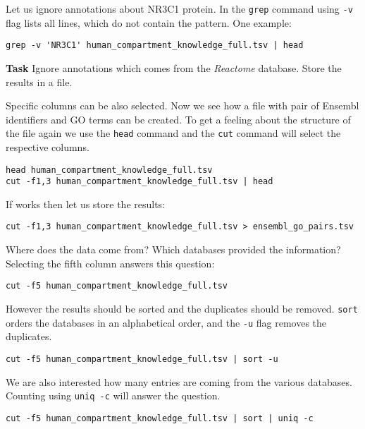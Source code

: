 \documentclass{article}\usepackage[]{graphicx}\usepackage[usenames,dvipsnames]{color}
\begin{document}
Let us ignore annotations about NR3C1 protein. In the \verb+grep+ command using \verb+-v+ flag lists all lines, which do not contain the pattern. One example:

\begin{verbatim}
grep -v 'NR3C1' human_compartment_knowledge_full.tsv | head
\end{verbatim}

\textbf{Task} Ignore annotations which comes from the \emph{Reactome} database. Store the results in a file.

Specific columns can be also selected. Now we see how a file with pair of Ensembl identifiers and GO terms can be created. To get a feeling about the structure of the file again we use the \verb+head+ command and the \verb+cut+ command will select the respective columns.

\begin{verbatim}
head human_compartment_knowledge_full.tsv
cut -f1,3 human_compartment_knowledge_full.tsv | head
\end{verbatim}

If works then let us store the results:

\begin{verbatim}
cut -f1,3 human_compartment_knowledge_full.tsv > ensembl_go_pairs.tsv
\end{verbatim}

Where does the data come from? Which databases provided the information? Selecting the fifth column answers this question:

\begin{verbatim}
cut -f5 human_compartment_knowledge_full.tsv
\end{verbatim}

However the results should be sorted and the duplicates should be removed. \verb+sort+ orders the databases in an alphabetical order, and the \verb+-u+ flag removes the duplicates.

\begin{verbatim}
cut -f5 human_compartment_knowledge_full.tsv | sort -u
\end{verbatim}

We are also interested how many entries are coming from the various databases. Counting using \verb+uniq -c+ will answer the question.

\begin{verbatim}
cut -f5 human_compartment_knowledge_full.tsv | sort | uniq -c
\end{verbatim}
\end{document}
